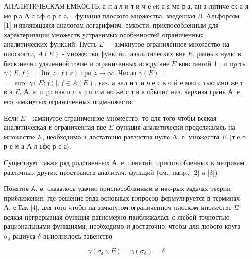 \documentclass[10pt]{article}
\begin{document}
АНАЛИТИЧЕСКАЯ ЕМКОСТЬ, а н а л и т и ч е cк а я ме р а, ан а литиче ск а я ме р а А л ьф о р с а, - функция плоского множества, введенная Л. Альфорсом [1] и являющаяся аналогом логарифмич. емкости, приспособленным для характеризации множеств устранимых особенностей ограниченных аналитических функций. Пусть $E-$ замкнутое ограниченное множество на плоскости, $A(E)$ - множество функций, аналитических вне $E$, равных нулю в бесконечно удаленной точке и ограниченных всюду вне $E$ константой 1 , и пусть $\gamma(E ; f)=\lim z \cdot f(z)$ при $z \rightarrow \infty$. Число $\gamma(E)=$ $=\sup |\gamma(E ; f)|, f \in A(E)$, наз. а нал и т и ч е с к о й е мко с тью мно же т в а $E$. А. е. п ро изв о л ь о о г м но же с т в а обычно наз. верхняя грань А. е. его замкнутых ограниченных подмножеств.



Если $E$ - замкнутое ограниченное множество, то для того чтобы всякая аналитическая и ограниченная вне $E$ функция аналитически продолжалась на множестве $E$, необходимо и достаточно равенство нулю А. е. множества $E$ (т е о р е м а А л ьфо р с а).



Существует также ряд родственных А. е. понятий, приспособленных к метрикам различных других пространств аналитич. функций (см., напр., [2] и [3]).



Понятие А. е. оказалось удачно приспособленным в нек-рых задачах теории приближения, где решение ряда основных вопросов формулируется в терминах А. е.Так [4], для того чтобы на замкнутом ограниченном плоском множестве $E$ всякая непрерывная функция равномерно приближалась с любой точностью рациональными функциями, необходимо и достаточно, чтобы для любого круга $\sigma_{\delta}$ радиуса $\delta$ вынолнялось равенство



\[

\gamma\left(\sigma_{\delta} \backslash E\right)=\gamma\left(\sigma_{\delta}\right)=\delta

\]
\end{document}
